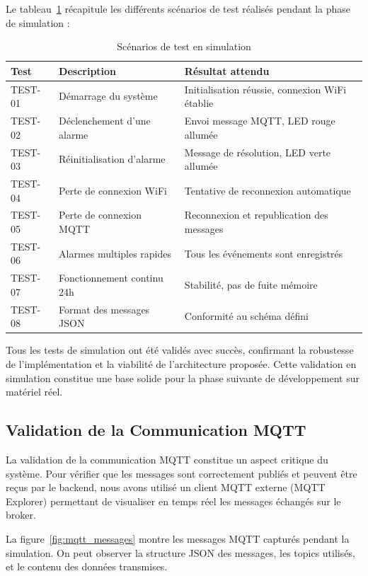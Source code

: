 Le tableau~\ref{tab:sim_tests} récapitule les différents scénarios de test réalisés pendant la phase de simulation :

\begin{table}[H]
\centering
\caption{Scénarios de test en simulation}
\label{tab:sim_tests}
\begin{tabular}{@{}p{}p{}p{}@{}}
\toprule
\textbf{Test} & \textbf{Description} & \textbf{Résultat attendu} \\
\midrule
TEST-01 & Démarrage du système & Initialisation réussie, connexion WiFi établie \\
TEST-02 & Déclenchement d'une alarme & Envoi message MQTT, LED rouge allumée \\
TEST-03 & Réinitialisation d'alarme & Message de résolution, LED verte allumée \\
TEST-04 & Perte de connexion WiFi & Tentative de reconnexion automatique \\
TEST-05 & Perte de connexion MQTT & Reconnexion et republication des messages \\
TEST-06 & Alarmes multiples rapides & Tous les événements sont enregistrés \\
TEST-07 & Fonctionnement continu 24h & Stabilité, pas de fuite mémoire \\
TEST-08 & Format des messages JSON & Conformité au schéma défini \\
\bottomrule
\end{tabular}
\end{table}

Tous les tests de simulation ont été validés avec succès, confirmant la robustesse de l'implémentation et la viabilité de l'architecture proposée. Cette validation en simulation constitue une base solide pour la phase suivante de développement sur matériel réel.


\subsection{Validation de la Communication MQTT}
\label{subsec:impl_mqtt_validation}

La validation de la communication MQTT constitue un aspect critique du système. Pour vérifier que les messages sont correctement publiés et peuvent être reçus par le backend, nous avons utilisé un client MQTT externe (MQTT Explorer) permettant de visualiser en temps réel les messages échangés sur le broker.

La figure~\ref{fig:mqtt_messages} montre les messages MQTT capturés pendant la simulation. On peut observer la structure JSON des messages, les topics utilisés, et le contenu des données transmises.

